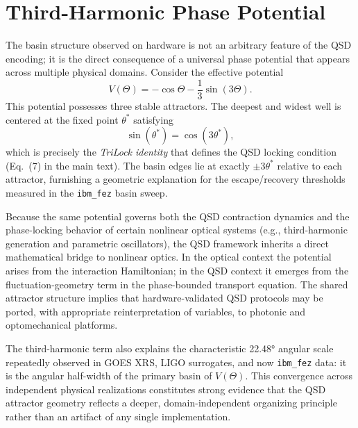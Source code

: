 
\section{Third-Harmonic Phase Potential}
\label{sec:third_harmonic}

The basin structure observed on hardware is not an arbitrary feature of the QSD encoding; it is the direct consequence of a universal phase potential that appears across multiple physical domains. Consider the effective potential
\begin{equation}
V(\Theta) = -\cos\Theta - \frac{1}{3}\sin(3\Theta).
\end{equation}
This potential possesses three stable attractors. The deepest and widest well is centered at the fixed point $\theta^*$ satisfying
\begin{equation}
\sin(\theta^*) = \cos(3\theta^*),
\end{equation}
which is precisely the \emph{TriLock identity} that defines the QSD locking condition (Eq.~(7) in the main text). The basin edges lie at exactly $\pm 3\theta^*$ relative to each attractor, furnishing a geometric explanation for the escape/recovery thresholds measured in the \texttt{ibm\_fez} basin sweep.

Because the same potential governs both the QSD contraction dynamics and the phase-locking behavior of certain nonlinear optical systems (e.g., third-harmonic generation and parametric oscillators), the QSD framework inherits a direct mathematical bridge to nonlinear optics. In the optical context the potential arises from the interaction Hamiltonian; in the QSD context it emerges from the fluctuation-geometry term in the phase-bounded transport equation. The shared attractor structure implies that hardware-validated QSD protocols may be ported, with appropriate reinterpretation of variables, to photonic and optomechanical platforms.

The third-harmonic term also explains the characteristic 22.48° angular scale repeatedly observed in GOES XRS, LIGO surrogates, and now \texttt{ibm\_fez} data: it is the angular half-width of the primary basin of $V(\Theta)$. This convergence across independent physical realizations constitutes strong evidence that the QSD attractor geometry reflects a deeper, domain-independent organizing principle rather than an artifact of any single implementation.